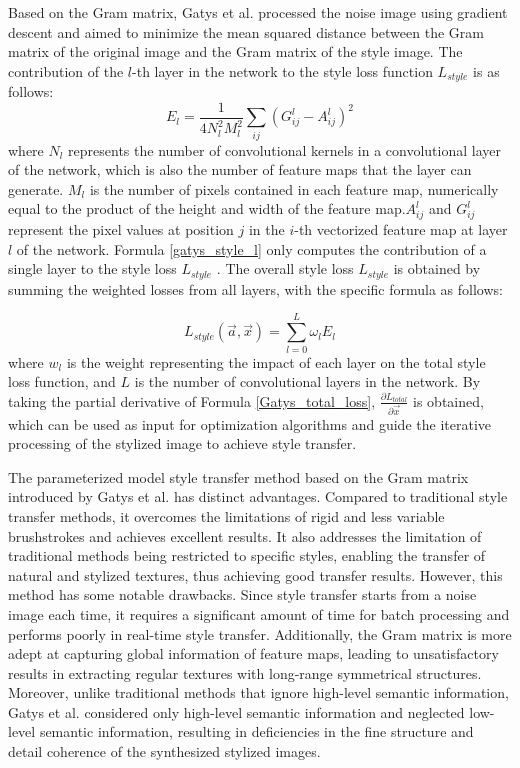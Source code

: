 Based on the Gram matrix, Gatys et al.\citep{02gatys2016image} processed the noise image using gradient descent and aimed to minimize the mean squared distance between the Gram matrix of the original image and the Gram matrix of the style image. The contribution of the $l$-th layer in the network to the style loss function $L_{style}$  is as follows:
\begin{equation}
    \label{Gatys_style_loss_l}
    E_l = \frac{1}{4N_l^2M_l^2}\sum_{ij}\left(G_{ij}^l-A_{ij}^l\right)^2
\end{equation}
where $N_l$ represents the number of convolutional kernels in a convolutional layer of the network, which is also the number of feature maps that the layer can generate. $M_l$ is the number of pixels contained in each feature map, numerically equal to the product of the height and width of the feature map.$A_{ij}^l$ and $G_{ij}^l$ represent the pixel values at position $j$ in the $i$-th vectorized feature map at layer $l$ of the network. Formula \ref{gatys_style_l} only computes the contribution of a single layer to the style loss $L_{style}$ . The overall style loss $L_{style}$  is obtained by summing the weighted losses from all layers, with the specific formula as follows:

\begin{equation}
    \label{gatys_style_l}
    L_{style}\left(\vec{a},\vec{x}\right)=\sum_{l=0}^L \omega_l E_l
\end{equation}
where $w_l$ is the weight representing the impact of each layer on the total style loss function, and $L$ is the number of convolutional layers in the network. By taking the partial derivative of Formula \ref{Gatys_total_loss}, $\frac{\partial L_{total}}{\partial \vec{x}}$ is obtained, which can be used as input for optimization algorithms and guide the iterative processing of the stylized image to achieve style transfer.

The parameterized model style transfer method based on the Gram matrix introduced by Gatys et al. has distinct advantages\citep{02gatys2016image}. Compared to traditional style transfer methods, it overcomes the limitations of rigid and less variable brushstrokes and achieves excellent results. It also addresses the limitation of traditional methods being restricted to specific styles, enabling the transfer of natural and stylized textures\citep{01jing2019neural}, thus achieving good transfer results. However, this method has some notable drawbacks. Since style transfer starts from a noise image each time, it requires a significant amount of time for batch processing and performs poorly in real-time style transfer. Additionally, the Gram matrix is more adept at capturing global information of feature maps, leading to unsatisfactory results in extracting regular textures with long-range symmetrical structures\citep{01jing2019neural}. Moreover, unlike traditional methods that ignore high-level semantic information, Gatys et al.\citep{02gatys2016image} considered only high-level semantic information and neglected low-level semantic information, resulting in deficiencies in the fine structure and detail coherence of the synthesized stylized images.

